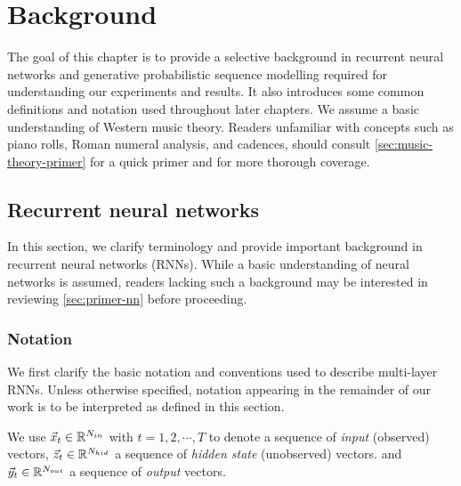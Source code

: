 \chapter{Background}

\ifpdf
    \graphicspath{{Chapter2/Figs/Raster/}{Chapter2/Figs/PDF/}{Chapter2/Figs/}}
\else
    \graphicspath{{Chapter2/Figs/Vector/}{Chapter2/Figs/}}
\fi

The goal of this chapter is to provide a selective background in recurrent neural
networks and generative probabilistic sequence modelling required for understanding
our experiments and results. It also introduces some common definitions and
notation used throughout later chapters. We assume a basic understanding of
Western music theory. Readers unfamiliar with concepts such as piano rolls,
Roman numeral analysis, and cadences, should consult
\vref{sec:music-theory-primer} for a quick primer and
\citet{piston1978harmony,denny1960oxford} for more thorough coverage.

\section{Recurrent neural networks}


In this section, we clarify terminology and provide important background in
recurrent neural networks (RNNs). While a basic understanding of neural
networks is assumed, readers lacking such a background may be interested in
reviewing \vref{sec:primer-nn} before proceeding.

\subsection{Notation}


We first clarify the basic notation and conventions used to describe multi-layer
RNNs. Unless otherwise specified, notation appearing in the
remainder of our work is to be interpreted as defined in this section.

We use $\vec{x}_t \in \mathbb{R}^{N_{in}}$ with $t=1,2,\cdots,T$ to denote a sequence of
\emph{input} (\ie observed) vectors, $\vec{z}_t \in \mathbb{R}^{N_{hid}}$ a sequence of
\emph{hidden state} (\ie unobserved) vectors. and $\vec{y}_t \in \mathbb{R}^{N_{out}}$ a
sequence of \emph{output} vectors.

